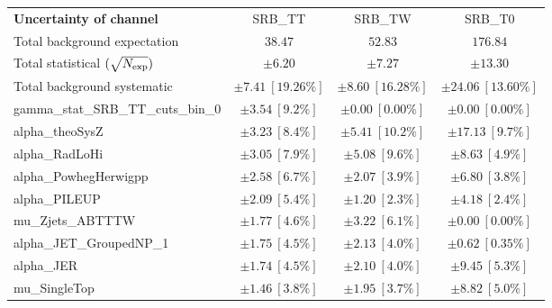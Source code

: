 
\begin{table}
\begin{center}
\setlength{\tabcolsep}{0.0pc}
\begin{tabular*}{\textwidth}{@{\extracolsep{\fill}}lccc}
\noalign{\smallskip}\hline\noalign{\smallskip}
{\bf Uncertainty of channel}                                    & SRB\_TT            & SRB\_TW            & SRB\_T0            \\
\noalign{\smallskip}\hline\noalign{\smallskip}
Total background expectation             &  $38.47$        &  $52.83$        &  $176.84$       \\
\noalign{\smallskip}\hline\noalign{\smallskip}
Total statistical $(\sqrt{N_{\rm exp}})$              & $\pm 6.20$        & $\pm 7.27$        & $\pm 13.30$       \\
Total background systematic               & $\pm 7.41\ [19.26\%] $        & $\pm 8.60\ [16.28\%] $        & $\pm 24.06\ [13.60\%] $             \\
\noalign{\smallskip}\hline\noalign{\smallskip}
\noalign{\smallskip}\hline\noalign{\smallskip}
gamma\_stat\_SRB\_TT\_cuts\_bin\_0         & $\pm 3.54\ [9.2\%] $          & $\pm 0.00\ [0.00\%] $          & $\pm 0.00\ [0.00\%] $       \\
alpha\_theoSysZ         & $\pm 3.23\ [8.4\%] $          & $\pm 5.41\ [10.2\%] $          & $\pm 17.13\ [9.7\%] $       \\
alpha\_RadLoHi         & $\pm 3.05\ [7.9\%] $          & $\pm 5.08\ [9.6\%] $          & $\pm 8.63\ [4.9\%] $       \\
alpha\_PowhegHerwigpp         & $\pm 2.58\ [6.7\%] $          & $\pm 2.07\ [3.9\%] $          & $\pm 6.80\ [3.8\%] $       \\
alpha\_PILEUP         & $\pm 2.09\ [5.4\%] $          & $\pm 1.20\ [2.3\%] $          & $\pm 4.18\ [2.4\%] $       \\
mu\_Zjets\_ABTTTW         & $\pm 1.77\ [4.6\%] $          & $\pm 3.22\ [6.1\%] $          & $\pm 0.00\ [0.00\%] $       \\
alpha\_JET\_GroupedNP\_1         & $\pm 1.75\ [4.5\%] $          & $\pm 2.13\ [4.0\%] $          & $\pm 0.62\ [0.35\%] $       \\
alpha\_JER         & $\pm 1.74\ [4.5\%] $          & $\pm 2.10\ [4.0\%] $          & $\pm 9.45\ [5.3\%] $       \\
mu\_SingleTop         & $\pm 1.46\ [3.8\%] $          & $\pm 1.95\ [3.7\%] $          & $\pm 8.82\ [5.0\%] $       \\

\end{tabular*}
\end{center}
\end{table}
